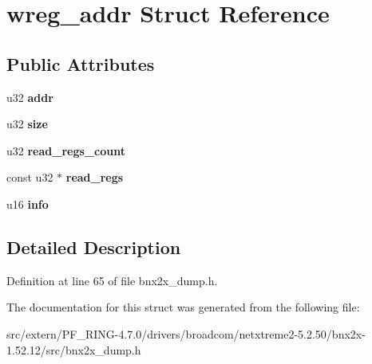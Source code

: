 \hypertarget{structwreg__addr}{
\section{wreg\_\-addr Struct Reference}
\label{structwreg__addr}
}
\subsection*{Public Attributes}
\begin{DoxyCompactItemize}
\item 
\hypertarget{structwreg__addr_a300c905cbb2996dafe38c95351b58186}{
u32 {\bfseries addr}}
\label{structwreg__addr_a300c905cbb2996dafe38c95351b58186}

\item 
\hypertarget{structwreg__addr_af0112f98367f18cfe8cb94971c40418a}{
u32 {\bfseries size}}
\label{structwreg__addr_af0112f98367f18cfe8cb94971c40418a}

\item 
\hypertarget{structwreg__addr_a97faa176967574d5547364186961447d}{
u32 {\bfseries read\_\-regs\_\-count}}
\label{structwreg__addr_a97faa176967574d5547364186961447d}

\item 
\hypertarget{structwreg__addr_a3891062e02087357ff99e3e55fdc4a0c}{
const u32 $\ast$ {\bfseries read\_\-regs}}
\label{structwreg__addr_a3891062e02087357ff99e3e55fdc4a0c}

\item 
\hypertarget{structwreg__addr_aa497dc3eaec1de36c7536090d5f88500}{
u16 {\bfseries info}}
\label{structwreg__addr_aa497dc3eaec1de36c7536090d5f88500}

\end{DoxyCompactItemize}


\subsection{Detailed Description}


Definition at line 65 of file bnx2x\_\-dump.h.



The documentation for this struct was generated from the following file:\begin{DoxyCompactItemize}
\item 
src/extern/PF\_\-RING-\/4.7.0/drivers/broadcom/netxtreme2-\/5.2.50/bnx2x-\/1.52.12/src/bnx2x\_\-dump.h\end{DoxyCompactItemize}
